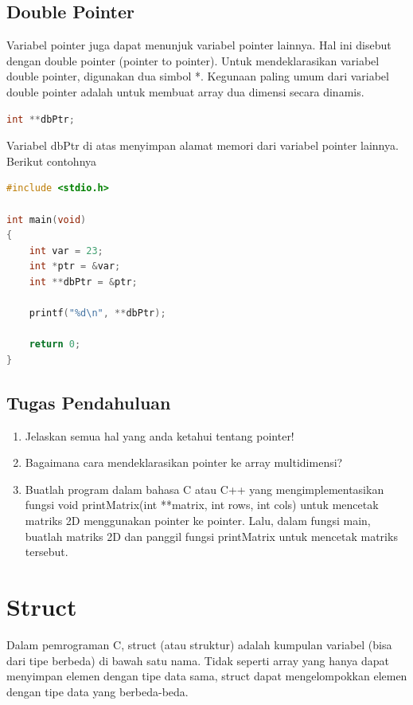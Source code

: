 \subsection{Double Pointer}
Variabel pointer juga dapat menunjuk variabel pointer lainnya.
Hal ini disebut dengan double pointer (pointer to pointer).
Untuk mendeklarasikan variabel double pointer, digunakan dua simbol *.
Kegunaan paling umum dari variabel double pointer adalah untuk membuat array dua dimensi secara dinamis.
\begin{lstlisting}[language=c]
    int **dbPtr;
\end{lstlisting}
Variabel dbPtr di atas menyimpan alamat memori dari variabel pointer lainnya. \\
Berikut contohnya
\begin{lstlisting}[language=c,  caption={Contoh Double Pointer}]
#include <stdio.h>

int main(void)
{
    int var = 23;
    int *ptr = &var;
    int **dbPtr = &ptr;

    printf("%d\n", **dbPtr);
        
    return 0;
}
\end{lstlisting}

\subsection{Tugas Pendahuluan}
\begin{enumerate}
    \item Jelaskan semua hal yang anda ketahui tentang pointer!
    \item Bagaimana cara mendeklarasikan pointer ke array multidimensi?
    \item Buatlah program dalam bahasa C atau C++ yang mengimplementasikan
          fungsi void printMatrix(int **matrix, int rows, int cols) untuk mencetak matriks 2D menggunakan pointer ke pointer. Lalu, dalam fungsi main,
          buatlah matriks 2D dan panggil fungsi printMatrix untuk mencetak matriks tersebut.
\end{enumerate}

\section{Struct}
Dalam pemrograman C, struct (atau struktur) adalah kumpulan variabel (bisa dari tipe berbeda) di bawah satu nama.
Tidak seperti array yang hanya dapat menyimpan elemen dengan tipe data sama,
struct dapat mengelompokkan elemen dengan tipe data yang berbeda-beda.


